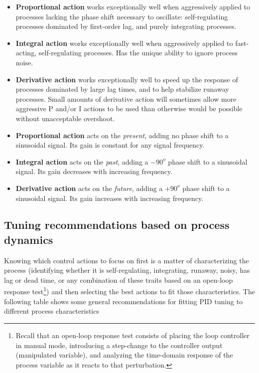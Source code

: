 \begin{itemize}
\item \textbf{Proportional action} works exceptionally well when aggressively applied to processes lacking the phase shift necessary to oscillate: self-regulating processes dominated by first-order lag, and purely integrating processes.
\item \textbf{Integral action} works exceptionally well when aggressively applied to fast-acting, self-regulating processes.  Has the unique ability to ignore process noise.
\item \textbf{Derivative action} works exceptionally well to speed up the response of processes dominated by large lag times, and to help stabilize runaway processes.  Small amounts of derivative action will sometimes allow more aggressive P and/or I actions to be used than otherwise would be possible without unacceptable overshoot.
\end{itemize}

\vskip 10pt

\noindent
{}

\begin{itemize}
\item \textbf{Proportional action} acts on the \textit{present}, adding no phase shift to a sinusoidal signal.  Its gain is constant for any signal frequency.
\item \textbf{Integral action} acts on the \textit{past}, adding a $-90^{o}$ phase shift to a sinusoidal signal.  Its gain decreases with increasing frequency.
\item \textbf{Derivative action} acts on the \textit{future}, adding a $+90^{o}$ phase shift to a sinusoidal signal.  Its gain increases with increasing frequency.
\end{itemize}







\filbreak
\subsection{Tuning recommendations based on process dynamics}

Knowing which control actions to focus on first is a matter of characterizing the process (identifying whether it is self-regulating, integrating, runaway, noisy, has lag or dead time, or any combination of these traits based on an open-loop response test\footnote{Recall that an open-loop response test consists of placing the loop controller in manual mode, introducing a step-change to the controller output (manipulated variable), and analyzing the time-domain response of the process variable as it reacts to that perturbation.}) and then selecting the best actions to fit those characteristics.  The following table shows some general recommendations for fitting PID tuning to different process characteristics

